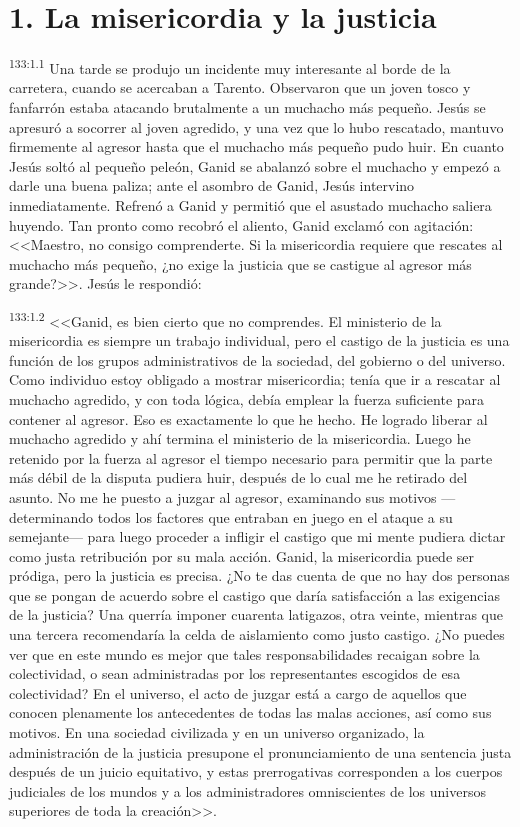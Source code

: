 \section*{1. La misericordia y la justicia}
\par 
\textsuperscript{133:1.1} Una tarde se produjo un incidente muy interesante al borde de la carretera, cuando se acercaban a Tarento. Observaron que un joven tosco y fanfarrón estaba atacando brutalmente a un muchacho más pequeño. Jesús se apresuró a socorrer al joven agredido, y una vez que lo hubo rescatado, mantuvo firmemente al agresor hasta que el muchacho más pequeño pudo huir. En cuanto Jesús soltó al pequeño peleón, Ganid se abalanzó sobre el muchacho y empezó a darle una buena paliza; ante el asombro de Ganid, Jesús intervino inmediatamente. Refrenó a Ganid y permitió que el asustado muchacho saliera huyendo. Tan pronto como recobró el aliento, Ganid exclamó con agitación: <<Maestro, no consigo comprenderte. Si la misericordia requiere que rescates al muchacho más pequeño, ¿no exige la justicia que se castigue al agresor más grande?>>. Jesús le respondió:

\par 
\textsuperscript{133:1.2} <<Ganid, es bien cierto que no comprendes. El ministerio de la misericordia es siempre un trabajo individual, pero el castigo de la justicia es una función de los grupos administrativos de la sociedad, del gobierno o del universo. Como individuo estoy obligado a mostrar misericordia; tenía que ir a rescatar al muchacho agredido, y con toda lógica, debía emplear la fuerza suficiente para contener al agresor. Eso es exactamente lo que he hecho. He logrado liberar al muchacho agredido y ahí termina el ministerio de la misericordia. Luego he retenido por la fuerza al agresor el tiempo necesario para permitir que la parte más débil de la disputa pudiera huir, después de lo cual me he retirado del asunto. No me he puesto a juzgar al agresor, examinando sus motivos ---determinando todos los factores que entraban en juego en el ataque a su semejante--- para luego proceder a infligir el castigo que mi mente pudiera dictar como justa retribución por su mala acción. Ganid, la misericordia puede ser pródiga, pero la justicia es precisa. ¿No te das cuenta de que no hay dos personas que se pongan de acuerdo sobre el castigo que daría satisfacción a las exigencias de la justicia? Una querría imponer cuarenta latigazos, otra veinte, mientras que una tercera recomendaría la celda de aislamiento como justo castigo. ¿No puedes ver que en este mundo es mejor que tales responsabilidades recaigan sobre la colectividad, o sean administradas por los representantes escogidos de esa colectividad? En el universo, el acto de juzgar está a cargo de aquellos que conocen plenamente los antecedentes de todas las malas acciones, así como sus motivos. En una sociedad civilizada y en un universo organizado, la administración de la justicia presupone el pronunciamiento de una sentencia justa después de un juicio equitativo, y estas prerrogativas corresponden a los cuerpos judiciales de los mundos y a los administradores omniscientes de los universos superiores de toda la creación>>.

